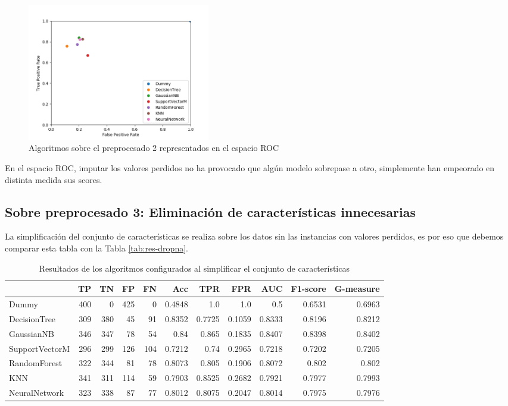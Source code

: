 \documentclass{article}
\begin{document}
\begin{figure}[H]
  \centering
  \label{fig:roc2}
  \caption{Algoritmos sobre el preprocesado 2 representados en el espacio ROC}
  \includegraphics[width=80mm]{figures/roc2}
\end{figure}

En el espacio ROC, imputar los valores perdidos no ha provocado que
algún modelo sobrepase a otro, simplemente han empeorado en distinta
medida sus scores.

\subsection{Sobre preprocesado 3: Eliminación de características
  innecesarias}

La simplificación del conjunto de características se realiza sobre los
datos sin las instancias con valores perdidos, es por eso que debemos
comparar esta tabla con la Tabla \ref{tab:res-dropna}.

\begin{table}[H]
\centering
\caption{Resultados de los algoritmos configurados al simplificar el
  conjunto de características}
\label{tab:res-features}
\begin{tabular}{|lrrrrrrrrrr|}
\hline
 & TP & TN & FP & FN & Acc & TPR & FPR & AUC & F1-score & G-measure\\ \hline
Dummy & 400 & 0 & 425 & 0 & 0.4848 & 1.0 & 1.0 & 0.5 & 0.6531 & 0.6963\\
DecisionTree & 309 & 380 & 45 & 91 & 0.8352 & 0.7725 & 0.1059 & 0.8333 & 0.8196 & 0.8212\\
GaussianNB & 346 & 347 & 78 & 54 & 0.84 & 0.865 & 0.1835 & 0.8407 & 0.8398 & 0.8402\\
SupportVectorM & 296 & 299 & 126 & 104 & 0.7212 & 0.74 & 0.2965 & 0.7218 & 0.7202 & 0.7205\\
RandomForest & 322 & 344 & 81 & 78 & 0.8073 & 0.805 & 0.1906 & 0.8072 & 0.802 & 0.802\\
KNN & 341 & 311 & 114 & 59 & 0.7903 & 0.8525 & 0.2682 & 0.7921 & 0.7977 & 0.7993\\
NeuralNetwork & 323 & 338 & 87 & 77 & 0.8012 & 0.8075 & 0.2047 & 0.8014 & 0.7975 & 0.7976\\
\hline
\end{tabular}
\end{table}
\end{document}
